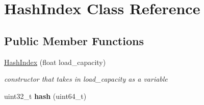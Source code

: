 \hypertarget{class_hash_index}{}\section{Hash\+Index Class Reference}
\label{class_hash_index}
\subsection*{Public Member Functions}
\begin{DoxyCompactItemize}
\item 
\hypertarget{class_hash_index_a42b72951825c779461709d0ce309f314}{}\hyperlink{class_hash_index_a42b72951825c779461709d0ce309f314}{Hash\+Index} (float load\+\_\+capacity)\label{class_hash_index_a42b72951825c779461709d0ce309f314}

\begin{DoxyCompactList}\small\item\em constructor that takes in load\+\_\+capacity as a variable \end{DoxyCompactList}\item 
\hypertarget{class_hash_index_a649efbc49a59fc99180af0a5c8a63f60}{}uint32\+\_\+t {\bfseries hash} (uint64\+\_\+t)\label{class_hash_index_a649efbc49a59fc99180af0a5c8a63f60}


\end{DoxyCompactItemize}
